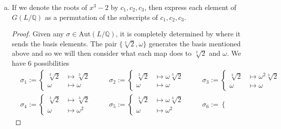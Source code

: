 \documentclass[12pt]{article}
\begin{document}
\begin{enumerate}
\begin{enumerate}[(a)]
                \item If we denote the roots of $x^3-2$ by $c_1, c_2, c_3$,
                    then express each element of $G(L/\mathbb{Q})$ as
                    a permutation of the subscripts of $c_1, c_2, c_3$. 
                    \begin{proof}
                        Given any $\sigma\in\text{Aut}(L/\mathbb{Q})$, it is
                        completely determined by where it sends the basis
                        elements. The pair $\{\sqrt[3]{2}, \omega\}$ generates
                        the basis mentioned above and so we
                        will then consider what each map does to $\sqrt[3]{2}$
                        and $\omega$. We have 6 possibilities
                        \begin{align*}
                            &\sigma_1:=\begin{cases}
                                \sqrt[3]{2}&\mapsto\sqrt[3]{2} \\
                                \omega&\mapsto \omega
                            \end{cases} & &
                            &\sigma_2:=\begin{cases}
                                \sqrt[3]{2}&\mapsto\omega\sqrt[3]{2} \\
                                \omega&\mapsto\omega  
                            \end{cases} & &
                            &\sigma_3:=\begin{cases}
                                \sqrt[3]{2}&\mapsto\omega^2\sqrt[3]{2} \\
                                \omega&\mapsto\omega
                            \end{cases} \\
                            &\sigma_4:=\begin{cases}
                                \sqrt[3]{2}&\mapsto\sqrt[3]{2} \\
                                \omega&\mapsto\omega^2
                            \end{cases} & & 
                            &\sigma_5:=\begin{cases}
                                \sqrt[3]{2}&\mapsto\omega\sqrt[3]{2} \\
                                \omega&\mapsto\omega^2
                            \end{cases} & &
                            &\sigma_6:=\begin{cases}

\end{cases}
\end{align*}
\end{proof}
\end{enumerate}
\end{enumerate}
\end{document}
